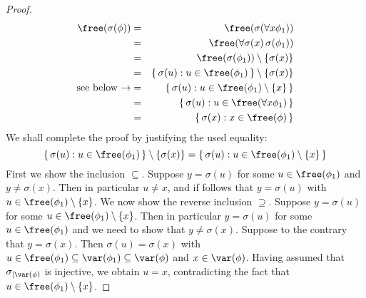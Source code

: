 \begin{proof}
    \begin{eqnarray*}
    \free(\sigma(\phi))&=&\free(\sigma(\forall x\phi_{1}))\\
    &=&\free(\forall\sigma(x)\,\sigma(\phi_{1}))\\
    &=&\free(\sigma(\phi_{1}))\setminus\{\sigma(x)\}\\
    &=&\{\,\sigma(u):u\in\free(\phi_{1})\,\}\setminus\{\sigma(x)\}\\
    \mbox{see below\ $\rightarrow$}&=&\{\,\sigma(u):u\in\free(\phi_{1})\setminus\{x\}\,\}\\
    &=&\{\,\sigma(u):u\in\free(\forall x\phi_{1})\,\}\\
    &=&\{\,\sigma(x):x\in\free(\phi)\,\}
    \end{eqnarray*}
We shall complete the proof by justifying the used equality:
    \[
    \{\,\sigma(u):u\in\free(\phi_{1})\,\}\setminus\{\sigma(x)\}
    =\{\,\sigma(u):u\in\free(\phi_{1})\setminus\{x\}\,\}
    \]
First we show the inclusion $\subseteq$. Suppose $y=\sigma(u)$ for
some $u\in\free(\phi_{1})$ and $y\neq\sigma(x)$. Then in particular
$u\neq x$, and if follows that $y=\sigma(u)$ with
$u\in\free(\phi_{1})\setminus\{x\}$. We now show the reverse
inclusion $\supseteq$. Suppose $y=\sigma(u)$ for some
$u\in\free(\phi_{1})\setminus\{x\}$. Then in particular
$y=\sigma(u)$ for some $u\in\free(\phi_{1})$ and we need to show
that $y\neq\sigma(x)$. Suppose to the contrary that $y=\sigma(x)$.
Then $\sigma(u)=\sigma(x)$ with
$u\in\free(\phi_{1})\subseteq\var(\phi_{1})\subseteq\var(\phi)$ and
$x\in\var(\phi)$. Having assumed that $\sigma_{|\var(\phi)}$ is
injective, we obtain $u=x$, contradicting the fact that
$u\in\free(\phi_{1})\setminus\{x\}$.
\end{proof}

